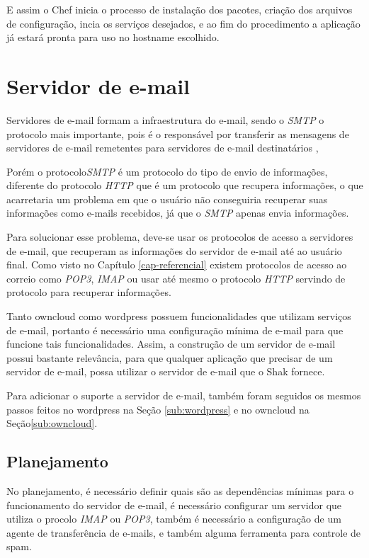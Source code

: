 E assim o Chef inicia o processo de instalação dos pacotes, criação dos arquivos
de configuração, incia os serviços desejados, e ao fim do procedimento a aplicação
já estará pronta para uso no hostname escolhido.


\section{Servidor de e-mail}
\label{sub:e-mail}

Servidores de e-mail formam a infraestrutura do e-mail, sendo o \textit{SMTP} o protocolo
mais importante, pois é o responsável por transferir as mensagens de servidores
de e-mail remetentes para servidores de e-mail destinatários \cite{kurose2010redes}, 

Porém o protocolo\textit{SMTP} é um protocolo do tipo de envio de informações, 
diferente do protocolo \textit{HTTP}
que é um protocolo que recupera informações, o que acarretaria um problema em que
o usuário não conseguiria recuperar suas informações como e-mails recebidos, já
que o \textit{SMTP} apenas envia informações.

Para solucionar esse problema, deve-se usar os protocolos de acesso a servidores de
e-mail, que recuperam as informações do servidor de e-mail até ao usuário final.
Como visto no Capítulo \ref{cap-referencial} existem protocolos de acesso ao correio
como \textit{POP3}, \textit{IMAP} ou usar até mesmo o protocolo \textit{HTTP} 
servindo de protocolo para recuperar informações.

Tanto owncloud como wordpress possuem funcionalidades que utilizam serviços 
de e-mail, portanto
é necessário uma configuração mínima de e-mail para que funcione tais funcionalidades.
Assim, a construção de um servidor de e-mail possui bastante relevância, para que
 qualquer aplicação que precisar de um servidor de e-mail, possa utilizar 
o servidor de e-mail que o Shak fornece.

Para adicionar o suporte a servidor de e-mail, também foram seguidos os mesmos passos
feitos no wordpress na Seção \ref{sub:wordpress} e no owncloud na Seção\ref{sub:owncloud}. 

\subsection{Planejamento}

No planejamento, é necessário definir
quais são as dependências mínimas para o funcionamento do servidor de e-mail, é 
necessário configurar um servidor que utiliza o procolo \textit{IMAP} ou \textit{POP3},
também é necessário a configuração de um agente de transferência de e-mails, e também
alguma ferramenta para controle de spam.

